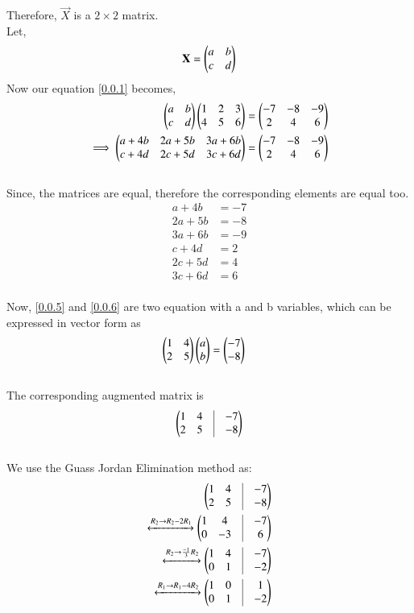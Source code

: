 \documentclass[journal,12pt,twocolumn]{IEEEtran}
\begin{document}
Therefore,
$\vec{X}$ is a $2 \times 2$ matrix.\\
Let,
\begin{align}
\mathbf{X} = \begin{pmatrix}a & b \\ c & d\end{pmatrix}    
\end{align}
Now our equation \eqref{0.0.1} becomes, 
\begin{align}
  \begin{pmatrix}a & b \\ c & d\end{pmatrix} \begin{pmatrix}1 & 2 & 3\\ 4 & 5 & 6\end{pmatrix} &= \begin{pmatrix}-7 & -8 & -9\\ 2 & 4 &  6\end{pmatrix} \\
  \implies \begin{pmatrix}a+4b & 2a+5b & 3a+6b\\ c+4d & 2c+5d & 3c+6d\end{pmatrix} &= \begin{pmatrix}-7 & -8 & -9\\ 2 & 4 &6\end{pmatrix} 
\end{align}\\
Since, the matrices are equal, therefore the corresponding elements are equal too.
\begin{align}
    a + 4b &= -7 \label{0.0.5}\\
    2a + 5b &= -8 \label{0.0.6}\\
    3a + 6b &= -9\\
    c + 4d &= 2 \label{0.0.8}\\
    2c + 5d &= 4 \label{0.0.9}\\
    3c + 6d &= 6
\end{align}\\
Now, \eqref{0.0.5} and \eqref{0.0.6} are two equation with a and b variables, which can be expressed in vector form as 
\begin{align}
    \begin{pmatrix}1 & 4 \\ 2 & 5\end{pmatrix}\begin{pmatrix}a \\ b\end{pmatrix} &= \begin{pmatrix}-7 \\ -8\end{pmatrix}
\end{align}\\
The corresponding augmented matrix is
\begin{align}
    	\myvec{
		1 & 4 & \vrule & -7 \\
		2 & 5 & \vrule & -8 \\
	}
\end{align}\\
We use the Guass Jordan Elimination method as:
\begin{align}
	\myvec{
		1 & 4 & \vrule & -7 \\
		2 & 5 & \vrule & -8 \\
	}
	\\
	\xleftrightarrow[]{R_2 \rightarrow R_2 - 2R_1}
	\myvec{
		1 & 4 & \vrule & -7 \\
		0 & -3 & \vrule & 6 \\
	}
	\\
	\xleftrightarrow[]{R_2\rightarrow \frac{-1}{3}R_2}
	\myvec{
		1 & 4 & \vrule & -7 \\
		0 & 1 & \vrule & -2 \\
	}
	\\
	\xleftrightarrow[]{R_1 \rightarrow R_1 - 4R_2}
	\myvec{
		1 & 0 & \vrule & 1 \\
		0 & 1 & \vrule & -2 \\
	}
\end{align}\\
\end{document}
